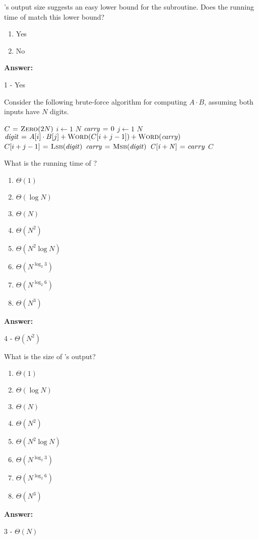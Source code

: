\documentclass[12pt,twoside]{article}
\newcommand{\answer}{
 \par\medskip
 \textbf{Answer:}
}
\newcommand{\answerIc}{ \answer
1 - Yes
}
\newcommand{\answerId}{ \answer
4 - $\Theta(N^2)$
}
\newcommand{\answerIe}{ \answer
3 - $\Theta(N)$
}
\begin{document}
\begin{problems}
\begin{problemparts}
\problempart {} 's output size suggests an easy lower bound
for the subroutine. Does the running time of  match this lower bound?
\begin{enumerate}
  \item Yes
  \item No
\end{enumerate}
\answerIc

\end{problemparts}

Consider the following brute-force algorithm for computing $A \cdot B$, assuming
both inputs have $N$ digits.

\begin{codebox}
\li $C \mathrel{\hspace{1pt}=\hspace{1pt}} \textnormal{\scshape Zero}(2N)$
\li \For $i \gets 1$ \To $N$ \label{li:mul-for1}
\li   \Do
        $\id{carry} \gets 0$
\li     \For $j \gets 1$ \To $N$ \label{li:mul-for2}
\li        \Do
             $\id{digit} \gets A[i] \cdot B[j] + \proc{Word}(C[i + j - 1]) +
                               \proc{Word}(\id{carry})$
\li           $C[i + j - 1] \gets \proc{Lsb}(\id{digit})$
\li           $\id{carry} \gets \proc{Msb}(\id{digit})$
           \End
\li     $\id{C[i + N]} \gets carry$
      \End
\li \Return $C$
\end{codebox}

\begin{problemparts}
\problempart {} What is the running time of ?
\begin{enumerate}
  \item $\Theta(1)$
  \item $\Theta(\log N)$
  \item $\Theta(N)$
  \item $\Theta(N^2)$
  \item $\Theta(N^2 \log N)$
  \item $\Theta(N^{\log_2 3})$
  \item $\Theta(N^{\log_2 6})$
  \item $\Theta(N^3)$
\end{enumerate}
\answerId

\problempart {} What is the size of 's output?
\begin{enumerate}
  \item $\Theta(1)$
  \item $\Theta(\log N)$
  \item $\Theta(N)$
  \item $\Theta(N^2)$
  \item $\Theta(N^2 \log N)$
  \item $\Theta(N^{\log_2 3})$
  \item $\Theta(N^{\log_2 6})$
  \item $\Theta(N^3)$
\end{enumerate}
\answerIe


\end{problemparts}
\end{problems}
\end{document}
